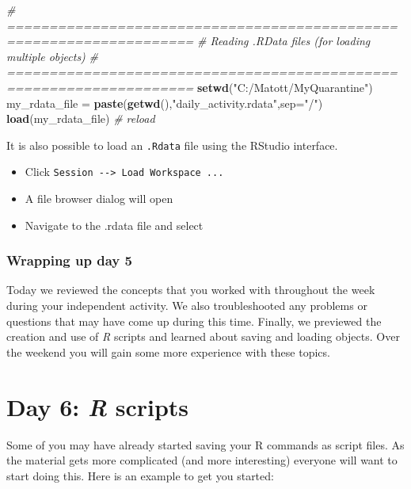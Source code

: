 \documentclass[
]{book}
\newenvironment{Shaded}{\begin{snugshade}}{\end{snugshade}}
\newcommand{\CommentTok}[1]{\textcolor[rgb]{0.56,0.35,0.01}{\textit{#1}}}
\newcommand{\DataTypeTok}[1]{\textcolor[rgb]{0.13,0.29,0.53}{#1}}
\newcommand{\KeywordTok}[1]{\textcolor[rgb]{0.13,0.29,0.53}{\textbf{#1}}}
\newcommand{\NormalTok}[1]{#1}
\newcommand{\StringTok}[1]{\textcolor[rgb]{0.31,0.60,0.02}{#1}}
\providecommand{\tightlist}{%
  \setlength{\itemsep}{0pt}\setlength{\parskip}{0pt}}
\begin{document}
\begin{Shaded}
\begin{Highlighting}[]
\CommentTok{# ====================================================================}
\CommentTok{# Reading .RData files (for loading multiple objects)}
\CommentTok{# ====================================================================}
\KeywordTok{setwd}\NormalTok{(}\StringTok{"C:/Matott/MyQuarantine"}\NormalTok{)}
\NormalTok{my_rdata_file =}\StringTok{ }\KeywordTok{paste}\NormalTok{(}\KeywordTok{getwd}\NormalTok{(),}\StringTok{"daily_activity.rdata"}\NormalTok{,}\DataTypeTok{sep=}\StringTok{"/"}\NormalTok{)}
\KeywordTok{load}\NormalTok{(my_rdata_file) }\CommentTok{# reload}
\end{Highlighting}
\end{Shaded}

It is also possible to load an \texttt{.Rdata} file using the RStudio interface.

\begin{itemize}
\tightlist
\item
  Click \texttt{Session\ -\/-\textgreater{}\ Load\ Workspace\ ...}
\item
  A file browser dialog will open
\item
  Navigate to the .rdata file and select
\end{itemize}

\hypertarget{wrapping-up-day-5}{%
\subsubsection*{Wrapping up day 5}\label{wrapping-up-day-5}}

Today we reviewed the concepts that you worked with throughout the week during your independent activity. We also troubleshooted any problems or questions that may have come up during this time. Finally, we previewed the creation and use of \emph{R} scripts and learned about saving and loading objects. Over the weekend you will gain some more experience with these topics.

\hypertarget{day-6-r-scripts}{%
\section{\texorpdfstring{Day 6: \emph{R} scripts}{Day 6: R scripts}}\label{day-6-r-scripts}}

Some of you may have already started saving your R commands as script files. As the material gets more complicated (and more interesting) everyone will want to start doing this. Here is an example to get you started:
\end{document}
